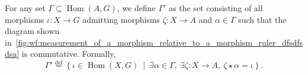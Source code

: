For any set \( \Gamma \subseteq \operatorname{Hom}(A, G) \),
    we define $\Gamma'$ as the set consisting of all morphisms \( \iota : X \to G \) admitting morphisms \( \zeta \colon X \to A \) and \( \alpha \in \Gamma \) such that the diagram shown in~\autoref{fig:wf:measurement_of_a_morphism_relative_to_a_morphism_ruler_dfsdfsdsa} is commutative.  Formally,  
    \[
    \Gamma' \overset{\operatorname{def}}{=} \left\{ \iota \in \operatorname{Hom}(X, G)~\middle|~\exists \alpha \in \Gamma,~\exists \zeta:X \to A,~\zeta \star \alpha = \iota \right\}. 
    \]
    \begin{figure}[H]
    \centering
    \caption{}
    \label{fig:wf:measurement_of_a_morphism_relative_to_a_morphism_ruler_dfsdfsdsa}
\end{figure} 
    

